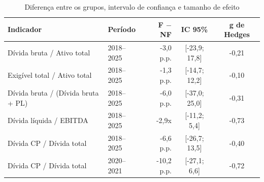 \begin{table}[htb]
\caption{Diferença entre os grupos, intervalo de confiança e tamanho de efeito}\label{tab:efeito}
\centering\footnotesize\setlength{\tabcolsep}{4pt}
\begin{tabular}{llrcc}
\toprule
Indicador & Período & F $-$ NF & IC 95\% & g de Hedges \\
\midrule
Dívida bruta / Ativo total & 2018--2025 & -3,0 p.p. & [-23,9; 17,8] & -0,21 \\
Exigível total / Ativo total & 2018--2025 & -1,3 p.p. & [-14,7; 12,2] & -0,10 \\
Dívida bruta / (Dívida bruta + PL) & 2018--2025 & -6,0 p.p. & [-37,0; 25,0] & -0,31 \\
Dívida líquida / EBITDA & 2018--2025 & -2,9x & [-11,2; 5,4] & -0,73 \\
Dívida CP / Dívida total & 2018--2025 & -6,6 p.p. & [-26,7; 13,5] & -0,40 \\
Dívida CP / Dívida total & 2020--2021 & -10,2 p.p. & [-27,1; 6,6] & -0,72 \\
\bottomrule
\end{tabular}
\end{table}
